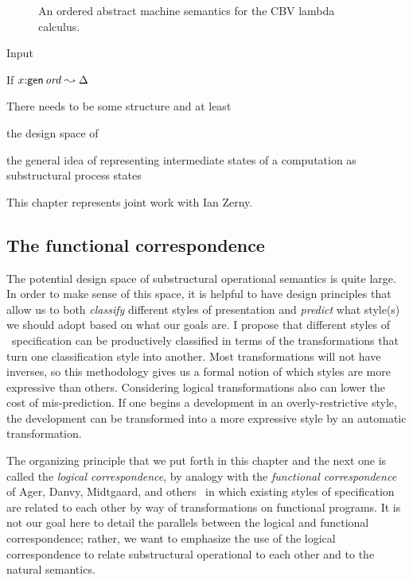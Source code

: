 \begin{figure}
\caption{An ordered abstract machine semantics for the CBV lambda calculus.}
\end{figure}

Input


\begin{theorem}
If $x{:}{\sf gen}\,{{\it ord}} \leadsto \Delta$
\end{theorem}

There needs to be some structure and
at least


the design space
of 

 the general idea
of representing intermediate states of a computation as 
substructural process states 

This chapter represents joint work with Ian Zerny.


\subsection{The functional correspondence}

The potential design space of substructural operational semantics is
quite large.  In order to make sense of this space, it is helpful to
have design principles that allow us to both {\it classify} different
styles of presentation and {\it predict} what style(s) we should adopt
based on what our goals are. I propose that different styles of
\sls~specification can be productively classified in terms of the
transformations that turn one classification style into another. Most
transformations will not have inverses, so this methodology gives us a
formal notion of which styles are more expressive than others.
Considering logical transformations also can lower the cost of
mis-prediction. If one begins a development in an overly-restrictive
style, the development can be transformed into a more expressive style
by an automatic transformation.

The organizing principle that we put forth in this chapter and the
next one is called the {\it logical correspondence}, by analogy with
the {\it functional correspondence} of Ager, Danvy, Midtgaard, and
others~\cite{ager03functional,ager04functional,ager05functional,
  danvy08defunctionalized} in which existing styles of specification
are related to each other by way of transformations on functional
programs. It is not our goal here to detail the parallels between the
logical and functional correspondence; rather, we want to emphasize
the use of the logical correspondence to relate substructural
operational to each other and to the natural semantics.


